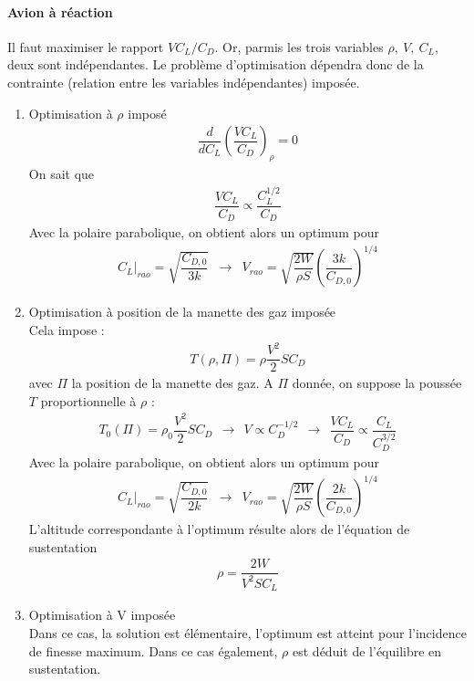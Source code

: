 \documentclass{report}
\begin{document}
\paragraph{Avion à réaction} Il faut maximiser le rapport $VC_L/C_D$. Or, parmis les trois variables $\rho,~V,~C_L$, deux sont indépendantes. Le problème d'optimisation dépendra donc de la contrainte (relation entre les variables indépendantes) imposée.
\begin{enumerate}
    \item Optimisation à $\rho$ imposé\\
    \begin{eqnarray}
    \dfrac{d}{dC_L}\left(\dfrac{V C_L}{C_D}\right)_\rho=0
    \end{eqnarray}
    On sait que
    \begin{eqnarray}
    \dfrac{VC_L}{C_D}\propto \dfrac{C_L^{1/2}}{C_D}
    \end{eqnarray}
    Avec la polaire parabolique, on obtient alors un optimum pour
    \begin{eqnarray}
    \left. C_L\right|_{rao}=\sqrt{\dfrac{C_{D,0}}{3k}}&\rightarrow & V_{rao}=\sqrt{\dfrac{2W}{\rho S}}\left(\dfrac{3k}{C_{D,0}}\right)^{1/4}
    \end{eqnarray}
    
    \item Optimisation à position de la manette des gaz imposée\\
    Cela impose :
    \begin{eqnarray}
    T(\rho,\Pi)=\rho\dfrac{V^2}{2}SC_D
    \end{eqnarray}
    avec $\Pi$ la position de la manette des gaz. A $\Pi$ donnée, on suppose la poussée $T$ proportionnelle à $\rho$ :
    \begin{eqnarray}
    T_0(\Pi)=\rho_0\dfrac{V^2}{2}SC_D~~\rightarrow~~V\propto C_D^{-1/2}~~\rightarrow~~\dfrac{VC_L}{C_D}\propto\dfrac{C_L}{C_D^{3/2}}
    \end{eqnarray}
    Avec la polaire parabolique, on obtient alors un optimum pour
    \begin{eqnarray}
    \left. C_L\right|_{rao}=\sqrt{\dfrac{C_{D,0}}{2k}}&\rightarrow & V_{rao}=\sqrt{\dfrac{2W}{\rho S}}\left(\dfrac{2k}{C_{D,0}}\right)^{1/4}
    \end{eqnarray}
    L'altitude correspondante à l'optimum résulte alors de l'équation de sustentation
    \begin{eqnarray}
    \rho = \dfrac{2W}{V^2SC_L}
    \end{eqnarray}
    
    \item Optimisation à V imposée\\
    Dans ce cas, la solution est élémentaire, l’optimum est atteint pour l’incidence de finesse maximum. Dans ce cas également, $\rho$ est déduit de l’équilibre en sustentation.
\end{enumerate}
\end{document}
